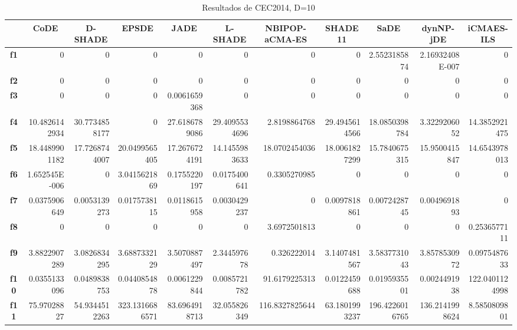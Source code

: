 \documentclass[a4paper,11pt]{article}
\begin{document}
  \begin{table}[H]
  \caption{Resultados de CEC2014, D=10}
  \begin{adjustbox}{width=1.15\textwidth}
  \centering
  \begin{tabular}{|c|r|r|r|r|r|r|r|r|r|r|}
  \hline
  \multicolumn{1}{|l|}{} & \multicolumn{1}{c|}{\textbf{CoDE}} & \multicolumn{1}{c|}{\textbf{D-SHADE}} & \multicolumn{1}{c|}{\textbf{EPSDE}} & \multicolumn{1}{c|}{\textbf{JADE}} & \multicolumn{1}{c|}{\textbf{L-SHADE}} & \multicolumn{1}{c|}{\textbf{NBIPOP-aCMA-ES}} & \multicolumn{1}{c|}{\textbf{SHADE11}} & \multicolumn{1}{c|}{\textbf{SaDE}} & \multicolumn{1}{c|}{\textbf{dynNP-jDE}} & \multicolumn{1}{c|}{\textbf{iCMAES-ILS}} \\ \hline
  \textbf{f1} & 0 & 0 & 0 & 0 & 0 & 0 & 0 & 2.5523185874 & 2.16932408E-007 & 0 \\ \hline
  \textbf{f2} & 0 & 0 & 0 & 0 & 0 & 0 & 0 & 0 & 0 & 0 \\ \hline
  \textbf{f3} & 0 & 0 & 0 & 0.0061659368 & 0 & 0 & 0 & 0 & 0 & 0 \\ \hline
  \textbf{f4} & 10.4826142934 & 30.7734858177 & 0 & 27.6186789086 & 29.4095534696 & 2.8198864768 & 29.4945614566 & 18.0850398784 & 3.3229206052 & 14.3852921475 \\ \hline
  \textbf{f5} & 18.4489901182 & 17.7268744007 & 20.0499565405 & 17.2676724191 & 14.1455983633 & 18.0702454036 & 18.0061827299 & 15.7840675315 & 15.9500415847 & 14.6543978013 \\ \hline
  \textbf{f6} & 1.652545E-006 & 0 & 3.0415621869 & 0.1755220197 & 0.0175400641 & 0.3305270985 & 0 & 0 & 0 & 0 \\ \hline
  \textbf{f7} & 0.0375906649 & 0.0053139273 & 0.0175738115 & 0.0118615958 & 0.0030429237 & 0 & 0.0097818861 & 0.0072428745 & 0.0049691893 & 0 \\ \hline
  \textbf{f8} & 0 & 0 & 0 & 0 & 0 & 3.6972501813 & 0 & 0 & 0 & 0.2536577111 \\ \hline
  \textbf{f9} & 3.8822907289 & 3.0826834295 & 3.6887332129 & 3.5070887497 & 2.344597678 & 0.326222014 & 3.1407481567 & 3.5837731043 & 3.8578530972 & 0.0975487633 \\ \hline
  \textbf{f10} & 0.0355133096 & 0.0489838753 & 0.0440854878 & 0.0061229844 & 0.0085721782 & 91.6179225313 & 0.0122459688 & 0.0195935501 & 0.0024491938 & 122.0401124998 \\ \hline
  \textbf{f11} & 75.97028827 & 54.9344512263 & 323.1316686571 & 83.6964918713 & 32.055826349 & 116.8327825644 & 63.1801993237 & 196.4226016765 & 136.2141998624 & 8.5850809801 \\ \hline

\end{tabular}
\end{adjustbox}
\end{table}
\end{document}
